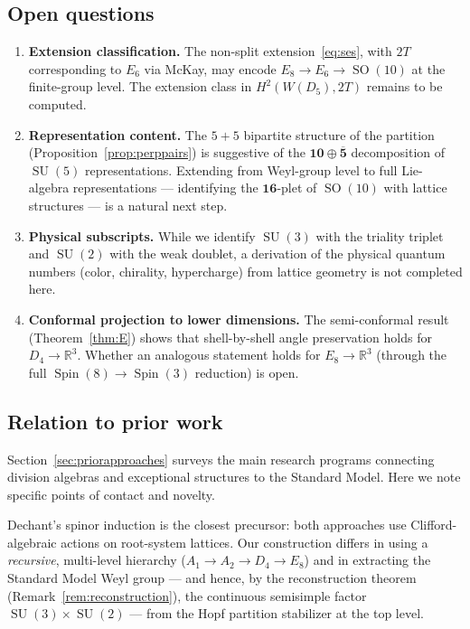 \documentclass[11pt,reqno]{amsart}
\theoremstyle{plain}
\theoremstyle{definition}
\theoremstyle{remark}
\newcommand{\R}{\mathbb{R}}
\DeclareMathOperator{\Spin}{Spin}
\DeclareMathOperator{\SO}{SO}
\DeclareMathOperator{\SU}{SU}
\begin{document}
\subsection{Open questions}\label{sec:open}

\begin{enumerate}
\item \textbf{Extension classification.}
  The non-split extension~\eqref{eq:ses}, with $2T$ corresponding
  to $E_6$ via McKay, may encode $E_8 \to E_6 \to \SO(10)$
  at the finite-group level.
  The extension class in $H^2(W(D_5), 2T)$ remains to be
  computed.

\item \textbf{Representation content.}
  The $5+5$ bipartite structure of the partition
  (Proposition~\ref{prop:perppairs}) is suggestive of the
  $\mathbf{10} \oplus \overline{\mathbf{5}}$ decomposition
  of $\SU(5)$ representations.
  Extending from Weyl-group level to full Lie-algebra
  representations --- identifying the $\mathbf{16}$-plet of
  $\SO(10)$ with lattice structures --- is a natural next step.

\item \textbf{Physical subscripts.}
  While we identify $\SU(3)$ with the triality triplet
  and $\SU(2)$ with the weak doublet, a derivation of
  the physical quantum numbers (color, chirality, hypercharge)
  from lattice geometry is not completed here.

\item \textbf{Conformal projection to lower dimensions.}
  The semi-conformal result (Theorem~\ref{thm:E}) shows that
  shell-by-shell angle preservation holds for $D_4 \to \R^3$.
  Whether an analogous statement holds for $E_8 \to \R^3$
  (through the full $\Spin(8) \to \Spin(3)$ reduction) is open.
\end{enumerate}

\subsection{Relation to prior work}

Section~\ref{sec:priorapproaches} surveys the main research
programs connecting division algebras and exceptional structures
to the Standard Model.
Here we note specific points of contact and novelty.

Dechant's spinor induction \cite{Dechant2016} is the closest
precursor: both approaches use Clifford-algebraic actions on
root-system lattices.
Our construction differs in using a \emph{recursive},
multi-level hierarchy ($A_1 \to A_2 \to D_4 \to E_8$) and
in extracting the Standard Model Weyl group --- and hence,
by the reconstruction theorem
(Remark~\ref{rem:reconstruction}), the continuous semisimple
factor $\SU(3)\times\SU(2)$ --- from the Hopf partition
stabilizer at the top level.
\end{document}
